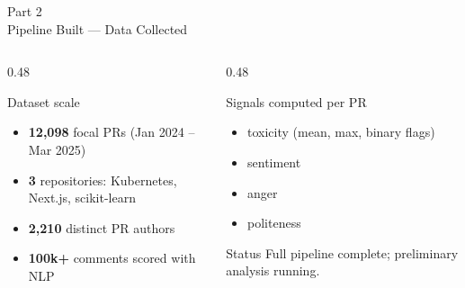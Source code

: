 \documentclass[aspectratio=169,11pt]{beamer}
\begin{document}
\begin{frame}{Part 2\\Pipeline Built — Data Collected}

{\centering
{}\par}

\vspace{-0.3em}
\begin{columns}[T]
\begin{column}{0.48\textwidth}
\begin{exampleblock}{Dataset scale}
\begin{itemize}
  \item \textbf{12,098} focal PRs (Jan 2024 -- Mar 2025)
  \item \textbf{3} repositories: Kubernetes, Next.js, scikit-learn
  \item \textbf{2,210} distinct PR authors
  \item \textbf{100k+} comments scored with NLP
\end{itemize}
\end{exampleblock}
\end{column}

\begin{column}{0.48\textwidth}
\begin{block}{Signals computed per PR}
\begin{itemize}
  \item toxicity (mean, max, binary flags)
  \item sentiment
  \item anger
  \item politeness
\end{itemize}
\end{block}
\begin{exampleblock}{Status}
Full pipeline complete; preliminary analysis running.
\end{exampleblock}
\end{column}
\end{columns}

\end{frame}
\end{document}

